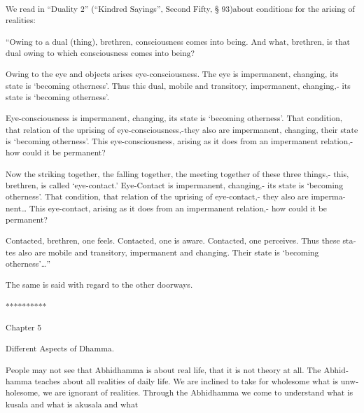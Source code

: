 \textsuperscript{\textdutch{We read in ``Duality 2'' (``Kindred
Sayings'', Second Fifty, § 93)about conditions for the arising of
realities:}}

\textsuperscript{``\textdutch{Owing to a dual (thing), brethren,
consciousness comes into being. And what, brethren, is that dual owing
to which }\textenglish[variant=american]{consciousness comes into
being}\textdutch{?}}

\textsuperscript{\textdutch{Owing to the eye and objects arises
eye-consciousness. The eye is impermanent, changing, its state is
`becoming otherness'. Thus this dual, mobile and transitory,
impermanent, changing,- its state is
}`\textenglish[variant=american]{becoming otherness}'.}

\textsuperscript{\textdutch{Eye-consciousness
}\textenglish[variant=american]{is impermanent, changing, its state is
}`\textenglish[variant=american]{becoming otherness}'.\textdutch{ That
condition, that relation of the uprising of eye-consciousness,-they also
are impermanent, changing, their state is
}`\textenglish[variant=american]{becoming otherness}'.\textdutch{ This
eye-consciousness, arising as it does from an impermanent relation,- how
could it be permanent?}}

\textsuperscript{\textdutch{Now the striking together, the falling
together, the meeting together of these three things,- this, brethren,
is called `eye-contact.' Eye-Contact is impermanent, changing,- its
state is }`\textenglish[variant=american]{becoming
otherness}'.\textdutch{ That condition, that relation of the uprising of
eye-contact,- they also are impermanent\ldots{} This eye-contact,
arising as it does from an impermanent relation,- how could it be
permanent?}}

\textsuperscript{\textdutch{Contacted, brethren, one feels. Contacted,
one is aware. Contacted, one perceives. Thus these states also are
mobile and transitory, impermanent and changing. Their state is
}`\textenglish[variant=american]{becoming
otherness}'\textdutch{\ldots{}''}}

\textsuperscript{\textdutch{The same is said with regard to the other
doorways. }}

\textsuperscript{\textdutch{**********}}

\textsuperscript{\textdutch{Chapter 5}}

\textsuperscript{\textdutch{Different Aspects of Dhamma.}}

\textsuperscript{\textdutch{P}\textenglish[variant=american]{eople may
not see that Abhidhamma is about real life, that it is not theory at
all. }\textdutch{The Abhidhamma teaches about all realities of daily
life. We are inclined to take for wholesome what is unwholesome, we are
ignorant of realities. Through the Abhidhamma we come to understand what
is kusala and what is akusala and what }}


